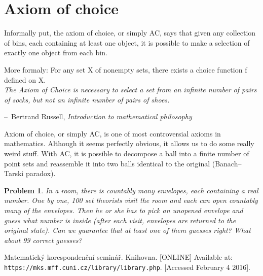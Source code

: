 \documentclass[11pt,a5paper]{article}
\makeatletter
\newtheorem{problem}{Problem}
\newenvironment{chapquote}[2][2em]
  {\setlength{\@tempdima}{#1}%
   \def\chapquote@author{#2}%
   \parshape 1 \@tempdima \dimexpr\textwidth-2\@tempdima\relax%
   \itshape}
  {\par\normalfont\hfill--\ \chapquote@author\hspace*{\@tempdima}\par\bigskip}
\makeatother
\begin{document}
\section{Axiom of choice}

\noindent Informally put, the axiom of choice, or simply AC, says that given any collection of bins, each containing at least one object, it is possible to make a selection of exactly one object from each bin.

\noindent More formaly: For any set X of nonempty sets, there exists a choice function f defined on X.
\\

\begin{chapquote}{Bertrand Russell, \textit{Introduction to mathematical philosophy}}
\noindent The Axiom of Choice is necessary to select a set from an infinite number of pairs of socks, but not an infinite number of pairs of shoes.
\end{chapquote}	

\noindent Axiom of choice, or simply AC, is one of most controversial axioms in mathematics. Although it seems perfectly obvious, it allows us to do some really weird stuff. With AC, it is possible to decompose a ball into a finite number of point sets and reassemble it into two balls identical to the original (Banach–Tarski paradox). 

\begin{problem}
In a room, there is countably many envelopes, each containing a real number. One by one, 100 set theorists visit the room and each can open countably many of the envelopes. Then he or she has to pick an unopened envelope and guess what number is inside (after each visit, envelopes are returned to the original state). Can we guarantee that at least one of them guesses right? What about 99 correct guesses?
\end{problem}


\begin{thebibliography}{9}
 Matematický korespondenční seminář. Knihovna. [ONLINE] Available at: \texttt{https://mks.mff.cuni.cz/library/library.php}. [Accessed February 4 2016].
\end{thebibliography}
\end{document}

